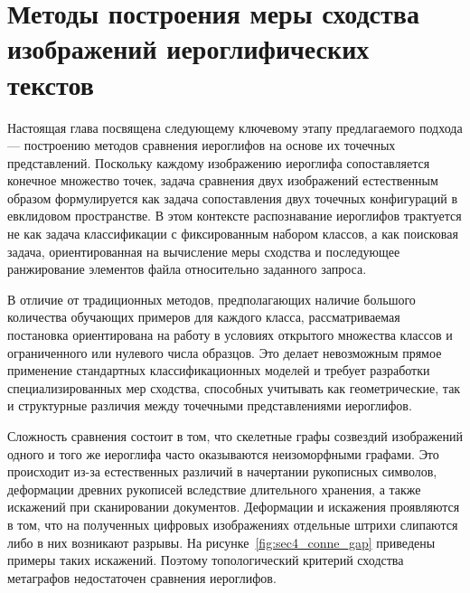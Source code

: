 \chapter{Методы построения меры сходства изображений иероглифических текстов}\label{ch:ch4}
Настоящая глава посвящена следующему ключевому этапу предлагаемого подхода — построению методов сравнения иероглифов на основе их точечных представлений. Поскольку каждому изображению иероглифа сопоставляется конечное множество точек, задача сравнения двух изображений естественным образом формулируется как задача сопоставления двух точечных конфигураций в евклидовом пространстве. В этом контексте распознавание иероглифов трактуется не как задача классификации с фиксированным набором классов, а как поисковая задача, ориентированная на вычисление меры сходства и последующее ранжирование элементов файла относительно заданного запроса.

В отличие от традиционных методов, предполагающих наличие большого количества обучающих примеров для каждого класса, рассматриваемая постановка ориентирована на работу в условиях открытого множества классов и ограниченного или нулевого числа образцов. Это делает невозможным прямое применение стандартных классификационных моделей и требует разработки специализированных мер сходства, способных учитывать как геометрические, так и структурные различия между точечными представлениями иероглифов.

Сложность сравнения состоит в том, что скелетные графы созвездий изображений одного и того же иероглифа часто оказываются неизоморфными графами. Это происходит из-за естественных различий в начертании рукописных символов, деформации древних рукописей вследствие длительного хранения, а также искажений при сканировании документов. Деформации и искажения проявляются в том, что на полученных цифровых изображениях отдельные штрихи слипаются либо в них возникают разрывы. На рисунке~\cref{fig:sec4_conne_gap} приведены примеры таких искажений. Поэтому топологический критерий сходства метаграфов недостаточен сравнения иероглифов.

